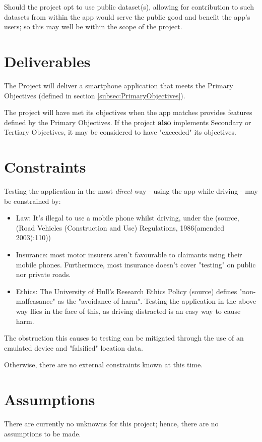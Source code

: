 \documentclass[11pt, a4paper, notitlepage]{report}
\begin{document}
Should the project opt to use public dataset(s), allowing for contribution to 
such datasets from within the app would serve the public good and benefit the 
app's users; so this may well be within the scope of the project.

\section{Deliverables}
The Project will deliver a smartphone application that meets the Primary 
Objectives (defined in section \ref{subsec:PrimaryObjectives}).

The project will have met its objectives when the app matches provides features 
defined by the Primary Objectives. If the project \textbf{also} implements 
Secondary or Tertiary Objectives, it may be considered to have "exceeded" its 
objectives.

\section{Constraints}
Testing the application in the most \textit{direct} way - using the app while 
driving - may be constrained by:
\begin{itemize}
	\item Law: It's illegal to use a mobile phone whilst driving, under the 
	(source, (Road Vehicles (Construction and Use) Regulations, 1986(amended 
	2003):110))
	\item Insurance: most motor insurers aren't favourable to claimants using 
	their mobile phones. Furthermore, most insurance doesn't cover "testing" on 
	public nor private roads.
	\item Ethics: The University of Hull's Research Ethics Policy (source) 
	defines "non-malfeasance" as the "avoidance of harm". Testing the 
	application in the above way flies in the face of this, as driving 
	distracted is an easy way to cause harm.
\end{itemize}
The obstruction this causes to testing can be mitigated through the use of an 
emulated device and "falsified" location data.

Otherwise, there are no external constraints known at this time.

\section{Assumptions}
There are currently no unknowns for this project; hence, there are no 
assumptions to be made.
\end{document}
